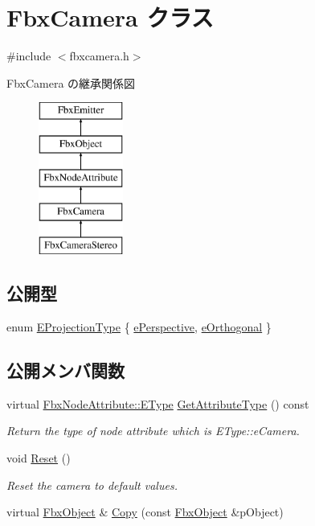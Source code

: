 \hypertarget{class_fbx_camera}{}\section{Fbx\+Camera クラス}
\label{class_fbx_camera}


{\ttfamily \#include $<$fbxcamera.\+h$>$}

Fbx\+Camera の継承関係図\begin{figure}[H]
\begin{center}
\leavevmode
\includegraphics[height=5.000000cm]{class_fbx_camera}
\end{center}
\end{figure}
\subsection*{公開型}
\begin{DoxyCompactItemize}
\item 
enum \hyperlink{class_fbx_camera_a717b9b0d28c8b20c115edf8c80016fb1}{E\+Projection\+Type} \{ \hyperlink{class_fbx_camera_a717b9b0d28c8b20c115edf8c80016fb1aa0ea1fe68c0ac171dae64779456dec9d}{e\+Perspective}, 
\hyperlink{class_fbx_camera_a717b9b0d28c8b20c115edf8c80016fb1aa04cb9cfd8a05c0406da47338eb62d3d}{e\+Orthogonal}
 \}
\end{DoxyCompactItemize}
\subsection*{公開メンバ関数}
\begin{DoxyCompactItemize}
\item 
virtual \hyperlink{class_fbx_node_attribute_a08e1669d3d1a696910756ab17de56d6a}{Fbx\+Node\+Attribute\+::\+E\+Type} \hyperlink{class_fbx_camera_a1149e4b05fd079637fe8d2a66a5a7a17}{Get\+Attribute\+Type} () const
\begin{DoxyCompactList}\small\item\em Return the type of node attribute which is E\+Type\+::e\+Camera. \end{DoxyCompactList}\item 
void \hyperlink{class_fbx_camera_aeeb56513eefdfe4b8df54181cfa44321}{Reset} ()
\begin{DoxyCompactList}\small\item\em Reset the camera to default values. \end{DoxyCompactList}\item 
virtual \hyperlink{class_fbx_object}{Fbx\+Object} \& \hyperlink{class_fbx_camera_ad6641b4f04167df79531fe4843834895}{Copy} (const \hyperlink{class_fbx_object}{Fbx\+Object} \&p\+Object)
\end{DoxyCompactItemize}
